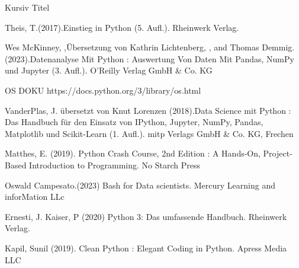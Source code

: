 \begin{thebibliography}{1}	%

Kursiv Titel

Theis, T.(2017).Einstieg in Python (5. Aufl.). Rheinwerk Verlag.

Wes McKinney, ,Übersetzung von Kathrin Lichtenberg, , and Thomas Demmig. (2023).Datenanalyse Mit Python : Auswertung Von Daten Mit Pandas, NumPy und Jupyter (3. Aufl.). O'Reilly Verlag GmbH & Co. KG

OS DOKU https://docs.python.org/3/library/os.html

VanderPlas, J. übersetzt von Knut Lorenzen (2018).Data Science mit Python : Das Handbuch für den Einsatz von IPython, Jupyter, NumPy, Pandas, Matplotlib und Scikit-Learn (1. Aufl.). mitp Verlags GmbH & Co. KG, Frechen

Matthes, E. (2019). Python Crash Course, 2nd Edition : A Hands-On, Project-Based Introduction to Programming. No Starch Press

Oswald Campesato.(2023) Bash for Data scientists.  Mercury Learning and inforMation LLc

Ernesti, J. Kaiser, P (2020) Python 3: Das umfassende Handbuch. Rheinwerk Verlag.

Kapil, Sunil (2019). Clean Python : Elegant Coding in Python. Apress Media LLC 


\end{thebibliography}